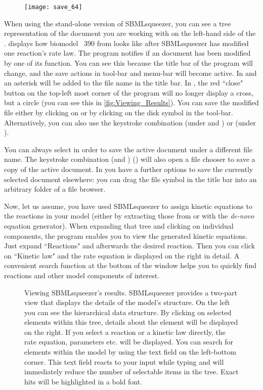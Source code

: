 \begin{figure}
\vspace{\wrapfigspace}
\texttt{[image: save\_64]}
\end{figure}
When using the stand-alone version of SBMLsqueezer, you can see a tree representation of the \SBML document you are working with on the left-hand side of the \GUI.
 displays how biomodel \numero~390 from \BioModels \citep{Li2010a} looks like after SBMLsqueezer has modified one reaction's rate law.
The program notifies if an \SBML document has been modified by one of its function.
You can see this because the title bar of the program will change, and the save actions in tool-bar and menu-bar will become active.
In \Windows and \Linux an asterisk will be added to the file name in the title bar.
In \MacOSX, the red ``close" button on the top-left most corner of the program will no longer display a cross, but a circle (you can see this in \vref{fig:Viewing_Results}).
You can save the modified file either by clicking on  or by clicking on the disk symbol in the tool-bar.
Alternatively, you can also use the keystroke combination  (under \Windows and \Linux) or  (under \MacOSX).

You can always select  in order to save the active \SBML document under a different file name.
The keystroke combination  (\Windows and \Linux)  (\MacOSX) will also open a file chooser to save a copy of the active \SBML document.
In \MacOSX you have a further options to save the currently selected document elsewhere: you can drag the file symbol in the title bar into an arbitrary folder of a file browser.

Now, let us assume, you have used SBMLsqueezer to assign kinetic equations to the reactions in your model (either by extracting those from \SABIO or with the \emph{de-novo} equation generator).
When expanding that tree and clicking on individual components, the program enables you to view the generated kinetic equations.
Just expand ``Reactions" and afterwards the desired reaction.
Then you can click on ``Kinetic law" and the rate equation is displayed on the right in detail.
A convenient search function at the bottom of the window helps you to quickly find reactions and other model components of interest.
\begin{figure}[t!]
\caption[Viewing SBMLsqueezer's results]{Viewing SBMLsqueezer's results.
SBMLsqueezer provides a two-part view that displays the details of the model's structure.
On the left you can see the hierarchical \SBML data structure.
By clicking on selected elements within this tree, details about the element will be displayed on the right.
If you select a reaction or a kinetic law directly, the rate equation, parameters etc. will be displayed.
You can search for elements within the model by using the text field on the left-bottom corner.
This text field reacts to your input while typing and will immediately reduce the number of selectable items in the tree.
Exact hits will be highlighted in a bold font.}
\label{fig:Viewing_Results}
\end{figure}

